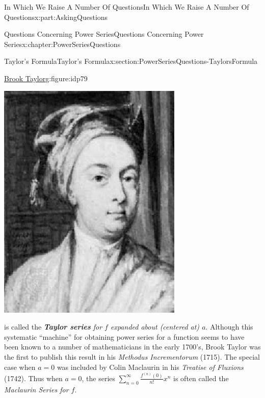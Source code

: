 \documentclass[oneside,10pt,]{book}
\newcommand{\alert}[1]{\textbf{\textit{#1}}}
\numberwithin{equation}{section}
\begin{document}
\begin{partptx}{In Which We Raise A Number Of Questions}{}{In Which We Raise A Number Of Questions}{}{}{x:part:AskingQuestions}
\begin{chapterptx}{Questions Concerning Power Series}{}{Questions Concerning Power Series}{}{}{x:chapter:PowerSeriesQuestions}
\begin{sectionptx}{Taylor's Formula}{}{Taylor's Formula}{}{}{x:section:PowerSeriesQuestions-TaylorsFormula}
\begin{figureptx}{\href{https://mathshistory.st-andrews.ac.uk/Biographies/Taylor/}{Brook Taylor}\protect\footnotemark{}}{g:figure:idp79}{}
\begin{image}{0.325}{0.35}{0.325}
\includegraphics[width=\linewidth]{images/Taylor.png}
\end{image}%
\tcblower
\end{figureptx}%
%
is called the \emph{\alert{Taylor series} for \(f\) expanded about (centered at) \(a\)}. Although this systematic ``machine'' for obtaining power series for a function seems to have been known to a number of mathematicians in the early 1700's, Brook Taylor  was the first to publish this result in his \textit{Methodus Incrementorum} (1715). The special case when \(a=0\) was included by Colin Maclaurin  in his \emph{Treatise of Fluxions} (1742). Thus when \(a=0\), the series \(\sum_{n=0}^\infty\frac{f^{(n)}(0)}{n!}x^n\) is often called the \emph{Maclaurin Series for \(f\)}.%
\par

\end{sectionptx}
\end{chapterptx}
\end{partptx}
\end{document}
